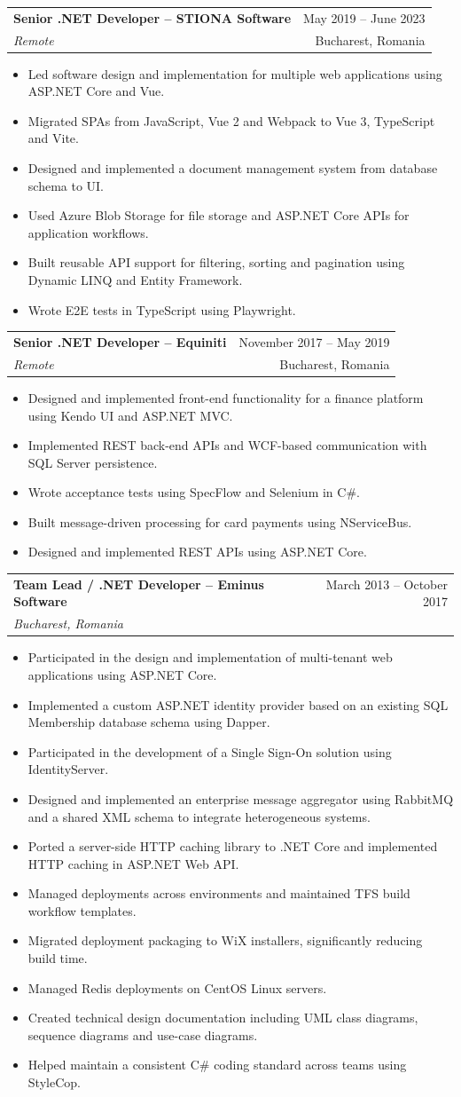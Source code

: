 \documentclass[letterpaper,11pt]{article}
\makeatletter
\newcommand{\resumeItem}[1]{
  \item\small{
    {#1 \vspace{-1pt}}
  }
}
\newcommand{\resumeSubheading}[4]{
  \vspace{-1pt}\item
    \begin{tabular*}{\textwidth}[t]{l@{\extracolsep{\fill}}r}
      \textbf{#1} & {\color{dark-grey}\small #2}\vspace{1pt}\\
      \textit{#3} & {\color{dark-grey} \small #4}\\
    \end{tabular*}\vspace{-4pt}
}
\newcommand{\resumeItemListStart}{\begin{itemize}}
\newcommand{\resumeItemListEnd}{\end{itemize}\vspace{0pt}}
\makeatother
\begin{document}
    \resumeSubheading
      {Senior .NET Developer -- STIONA Software}{May 2019 -- June 2023}
      {Remote}{Bucharest, Romania}
      \resumeItemListStart
       \resumeItem{Led software design and implementation for multiple web applications using ASP.NET Core and Vue.}
       \resumeItem{Migrated SPAs from JavaScript, Vue 2 and Webpack to Vue 3, TypeScript and Vite.}
       \resumeItem{Designed and implemented a document management system from database schema to UI.}
       \resumeItem{Used Azure Blob Storage for file storage and ASP.NET Core APIs for application workflows.}
       \resumeItem{Built reusable API support for filtering, sorting and pagination using Dynamic LINQ and Entity Framework.}
       \resumeItem{Wrote E2E tests in TypeScript using Playwright.}
      \resumeItemListEnd

    \resumeSubheading
      {Senior .NET Developer -- Equiniti}{November 2017 -- May 2019}
      {Remote}{Bucharest, Romania}
      \resumeItemListStart
        \resumeItem{Designed and implemented front-end functionality for a finance platform using Kendo UI and ASP.NET MVC.}
        \resumeItem{Implemented REST back-end APIs and WCF-based communication with SQL Server persistence.}
        \resumeItem{Wrote acceptance tests using SpecFlow and Selenium in C\#.}
        \resumeItem{Built message-driven processing for card payments using NServiceBus.}
        \resumeItem{Designed and implemented REST APIs using ASP.NET Core.}
    \resumeItemListEnd

    \resumeSubheading
      {Team Lead / .NET Developer -- Eminus Software}{March 2013 -- October 2017}
      {Bucharest, Romania}{}
      \resumeItemListStart
        \resumeItem{Participated in the design and implementation of multi-tenant web applications using ASP.NET Core.}
        \resumeItem{Implemented a custom ASP.NET identity provider based on an existing SQL Membership database schema using Dapper.}
        \resumeItem{Participated in the development of a Single Sign-On solution using IdentityServer.}
        \resumeItem{Designed and implemented an enterprise message aggregator using RabbitMQ and a shared XML schema to integrate heterogeneous systems.}
        \resumeItem{Ported a server-side HTTP caching library to .NET Core and implemented HTTP caching in ASP.NET Web API.}
        \resumeItem{Managed deployments across environments and maintained TFS build workflow templates.}
        \resumeItem{Migrated deployment packaging to WiX installers, significantly reducing build time.}
        \resumeItem{Managed Redis deployments on CentOS Linux servers.}
        \resumeItem{Created technical design documentation including UML class diagrams, sequence diagrams and use-case diagrams.}
        \resumeItem{Helped maintain a consistent C\# coding standard across teams using StyleCop.}
      \resumeItemListEnd
\end{document}
